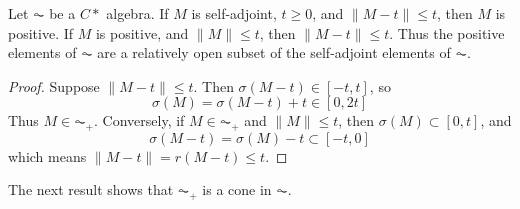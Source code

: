
\begin{lemma}
    Let $\AC$ be a $C*$ algebra. If $M$ is self-adjoint, $t \geq 0$, and $\| M - t \| \leq t$, then $M$ is positive. If $M$ is positive, and $\| M \| \leq t$, then $\| M - t \| \leq t$. Thus the positive elements of $\AC$ are a relatively open subset of the self-adjoint elements of $\AC$.
\end{lemma}
\begin{proof}
    Suppose $\| M - t \| \leq t$. Then $\sigma(M - t) \in [-t,t]$, so
    \[ \sigma(M) = \sigma(M - t) + t \in [0, 2t] \]
    Thus $M \in \AC_+$. Conversely, if $M \in \AC_+$ and $\| M \| \leq t$, then $\sigma(M) \subset [0,t]$, and
    \[ \sigma(M - t) = \sigma(M) - t \subset [-t,0] \]
    which means $\| M - t \| = r(M - t) \leq t$.
\end{proof}

The next result shows that $\AC_+$ is a cone in $\AC$.

